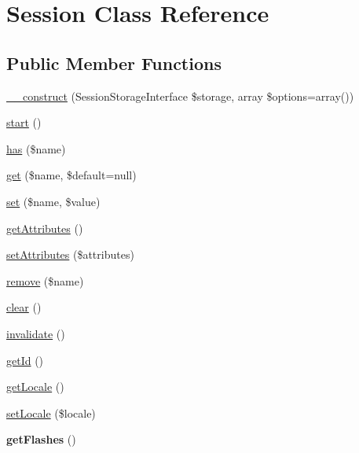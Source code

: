 \hypertarget{class_symfony_1_1_component_1_1_http_foundation_1_1_session}{
\section{\-Session \-Class \-Reference}
\label{class_symfony_1_1_component_1_1_http_foundation_1_1_session}
}
\subsection*{\-Public \-Member \-Functions}
\begin{DoxyCompactItemize}
\item 
\hyperlink{class_symfony_1_1_component_1_1_http_foundation_1_1_session_a3dfa821cb2c0df3e4d386fbf476f504f}{\-\_\-\-\_\-construct} (\-Session\-Storage\-Interface \$storage, array \$options=array())
\item 
\hyperlink{class_symfony_1_1_component_1_1_http_foundation_1_1_session_af8fa59992209e36dccb3eefb0f75531f}{start} ()
\item 
\hyperlink{class_symfony_1_1_component_1_1_http_foundation_1_1_session_a623d004aa083376c599112f235c0af9d}{has} (\$name)
\item 
\hyperlink{class_symfony_1_1_component_1_1_http_foundation_1_1_session_a0f4ee84415fb0af205502dc664acde81}{get} (\$name, \$default=null)
\item 
\hyperlink{class_symfony_1_1_component_1_1_http_foundation_1_1_session_aa4c6a0b87c6e47fa6f863eedb300e707}{set} (\$name, \$value)
\item 
\hyperlink{class_symfony_1_1_component_1_1_http_foundation_1_1_session_afbe85ec4b9947cc951c67d63911cf0a4}{get\-Attributes} ()
\item 
\hyperlink{class_symfony_1_1_component_1_1_http_foundation_1_1_session_ab51c07910120afdf4df575bec5c819d1}{set\-Attributes} (\$attributes)
\item 
\hyperlink{class_symfony_1_1_component_1_1_http_foundation_1_1_session_aebff052f548656a86f5b9e0048a5c325}{remove} (\$name)
\item 
\hyperlink{class_symfony_1_1_component_1_1_http_foundation_1_1_session_aa821bec12eaa7e0f649397c9675ff505}{clear} ()
\item 
\hyperlink{class_symfony_1_1_component_1_1_http_foundation_1_1_session_acffa5e0bf16e764925b1336c731f6160}{invalidate} ()
\item 
\hyperlink{class_symfony_1_1_component_1_1_http_foundation_1_1_session_a12251d0c022e9e21c137a105ff683f13}{get\-Id} ()
\item 
\hyperlink{class_symfony_1_1_component_1_1_http_foundation_1_1_session_ad532b661eb33c3e755bd3fa8ff1bd7af}{get\-Locale} ()
\item 
\hyperlink{class_symfony_1_1_component_1_1_http_foundation_1_1_session_a1bef7c51e9f6a97840f016a8f0a615ae}{set\-Locale} (\$locale)
\item 
\hypertarget{class_symfony_1_1_component_1_1_http_foundation_1_1_session_ab8bbfeaf34012fc8c87f5c10a34335e8}{
{\bfseries get\-Flashes} ()}
\label{class_symfony_1_1_component_1_1_http_foundation_1_1_session_ab8bbfeaf34012fc8c87f5c10a34335e8}


\end{DoxyCompactItemize}
